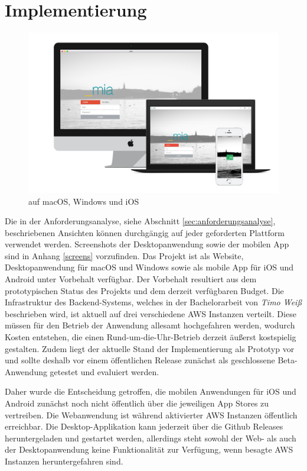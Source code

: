 \newpage

\section{Implementierung}

\begin{figure}[h]
 \centering
  \includegraphics[width=1\linewidth]{kapitel5/showcase.png}
 \caption{\projectname{} auf macOS, Windows und iOS}
 \label{kapitel5/cross}
\end{figure}
\vspace{0.3cm}

\noindent Die in der Anforderungsanalyse, siehe Abschnitt \ref{sec:anforderungsanalyse}, beschriebenen Ansichten können durchgängig auf jeder geforderten Plattform verwendet werden.
Screenshots der Desktopanwendung sowie der mobilen App sind in Anhang \ref{screens} vorzufinden.
Das Projekt \projectname{} ist als Website, Desktopanwendung für macOS und Windows sowie als mobile App für iOS und Android unter Vorbehalt verfügbar.
Der Vorbehalt resultiert aus dem prototypischen Status des Projekts und dem derzeit verfügbaren Budget.
Die Infrastruktur des Backend-Systems, welches in der Bachelorarbeit von \emph{Timo Weiß} beschrieben wird,
ist aktuell auf drei verschiedene \ac{AWS} Instanzen verteilt. Diese müssen für den Betrieb der Anwendung allesamt
hochgefahren werden, wodurch Kosten entstehen, die einen Rund-um-die-Uhr-Betrieb derzeit äußerst kostspielig gestalten.
Zudem liegt der aktuelle Stand der Implementierung als Prototyp vor und sollte deshalb vor einem
öffentlichen Release zunächst als geschlossene Beta-Anwendung getestet und evaluiert werden.

Daher wurde die Entscheidung getroffen, die mobilen Anwendungen für iOS und Android zunächst noch nicht öffentlich über die jeweiligen App Stores zu vertreiben.
Die Webanwendung ist während aktivierter \ac{AWS} Instanzen öffentlich erreichbar.
Die Desktop-Applikation kann jederzeit über die Github Releases heruntergeladen und gestartet werden,
allerdings steht sowohl der Web- als auch der Desktopanwendung keine Funktionalität zur Verfügung, wenn besagte \ac{AWS}
Instanzen heruntergefahren sind.

